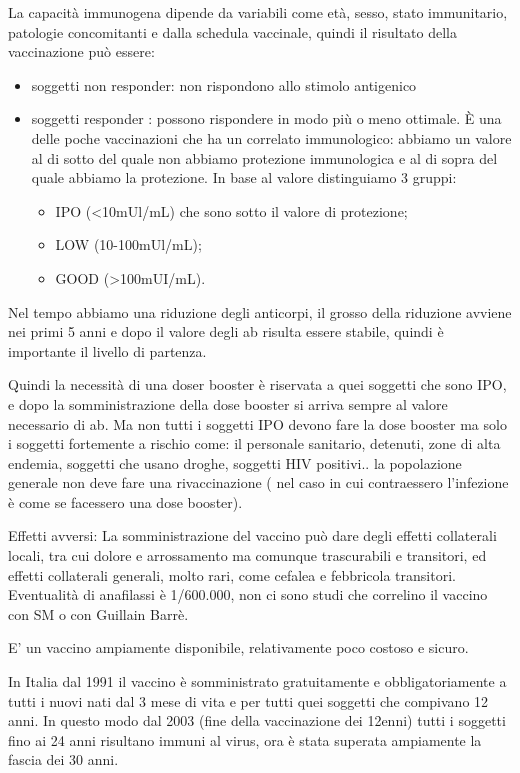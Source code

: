   La capacità immunogena dipende da variabili come età, sesso, stato
  immunitario, patologie concomitanti e dalla schedula vaccinale, quindi
  il risultato della vaccinazione può essere:
\begin{itemize}
\item soggetti non responder: non rispondono allo stimolo antigenico
\item soggetti responder : possono rispondere in modo più o meno
  ottimale. È una delle poche vaccinazioni che ha un correlato
  immunologico: abbiamo un valore al di sotto del quale non abbiamo
  protezione immunologica e al di sopra del quale abbiamo la protezione.
  In base al valore distinguiamo 3 gruppi:

\begin{itemize}
\item
  IPO (<10mUl/mL) che sono sotto il valore di protezione;
\item
  LOW (10-100mUl/mL);
\item
  GOOD (>100mUI/mL).
\end{itemize}
\end{itemize}
  Nel tempo abbiamo una riduzione degli anticorpi, il grosso della
  riduzione avviene nei primi 5 anni e dopo il valore degli ab risulta
  essere stabile, quindi è importante il livello di partenza.

  Quindi la necessità di una doser booster è riservata a quei soggetti
  che sono IPO, e dopo la somministrazione della dose booster si arriva
  sempre al valore necessario di ab. Ma non tutti i soggetti IPO devono
  fare la dose booster ma solo i soggetti fortemente a rischio come: il
  personale sanitario, detenuti, zone di alta endemia, soggetti che
  usano droghe, soggetti HIV positivi.. la popolazione generale non deve
  fare una rivaccinazione ( nel caso in cui contraessero l'infezione è
  come se facessero una dose booster).

  Effetti avversi: La somministrazione del vaccino può dare degli
  effetti collaterali locali, tra cui dolore e arrossamento ma comunque
  trascurabili e transitori, ed effetti collaterali generali, molto
  rari, come cefalea e febbricola transitori. Eventualità di anafilassi
  è 1/600.000, non ci sono studi che correlino il vaccino con SM o con
  Guillain Barrè.

  E' un vaccino ampiamente disponibile, relativamente poco costoso e
  sicuro.

  In Italia dal 1991 il vaccino è somministrato gratuitamente e
  obbligatoriamente a tutti i nuovi nati dal 3 mese di vita e per tutti
  quei soggetti che compivano 12 anni. In questo modo dal 2003 (fine
  della vaccinazione dei 12enni) tutti i soggetti fino ai 24 anni
  risultano immuni al virus, ora è stata superata ampiamente la fascia
  dei 30 anni.

